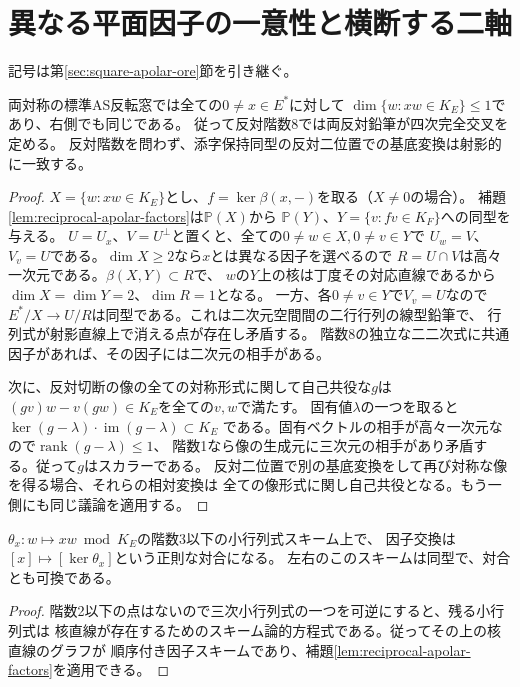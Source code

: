 \section{異なる平面因子の一意性と横断する二軸}
\label{sec:distinct-factor-rigidity}
記号は第\ref{sec:square-apolar-ore}節を引き継ぐ。

\begin{theorem}[各因子の相手の一意性]\label{thm:unique-linear-factor-partner}
両対称の標準AS反転窓では全ての$0\ne x\in E^*$に対して
$\dim\{w:xw\in K_E\}\le1$であり、右側でも同じである。
従って反対階数8では両反対鉛筆が四次完全交叉を定める。
反対階数を問わず、添字保持同型の反対二位置での基底変換は射影的に一致する。
\end{theorem}
\begin{proof}
$X=\{w:xw\in K_E\}$とし、$f=\ker\beta(x,-)$を取る（$X\ne0$の場合）。
補題\ref{lem:reciprocal-apolar-factors}は$\mathbb P(X)$から
$\mathbb P(Y)$、$Y=\{v:fv\in K_F\}$への同型を与える。
$U=U_x$、$V=U^\perp$と置くと、全ての$0\ne w\in X,0\ne v\in Y$で
$U_w=V$、$V_v=U$である。$\dim X\ge2$なら$x$とは異なる因子を選べるので
$R=U\cap V$は高々一次元である。$\beta(X,Y)\subset R$で、
$w$の$Y$上の核は丁度その対応直線であるから$\dim X=\dim Y=2$、$\dim R=1$となる。
一方、各$0\ne v\in Y$で$V_v=U$なので
$E^*/X\to U/R$は同型である。これは二次元空間間の二行行列の線型鉛筆で、
行列式が射影直線上で消える点が存在し矛盾する。
階数8の独立な二二次式に共通因子があれば、その因子には二次元の相手がある。

次に、反対切断の像の全ての対称形式に関して自己共役な$g$は
$(gv)w-v(gw)\in K_E$を全ての$v,w$で満たす。
固有値$\lambda$の一つを取ると$\ker(g-\lambda)\cdot\operatorname{im}(g-\lambda)\subset K_E$
である。固有ベクトルの相手が高々一次元なので$\operatorname{rank}(g-\lambda)\le1$、
階数1なら像の生成元に三次元の相手があり矛盾する。従って$g$はスカラーである。
反対二位置で別の基底変換をして再び対称な像を得る場合、それらの相対変換は
全ての像形式に関し自己共役となる。もう一側にも同じ議論を適用する。
\end{proof}

\begin{corollary}[スキームとしての因子曲面の切断]
$\theta_x:w\mapsto xw\bmod K_E$の階数3以下の小行列式スキーム上で、
因子交換は$[x]\mapsto[\ker\theta_x]$という正則な対合になる。
左右のこのスキームは同型で、対合とも可換である。
\end{corollary}
\begin{proof}
階数2以下の点はないので三次小行列式の一つを可逆にすると、残る小行列式は
核直線が存在するためのスキーム論的方程式である。従ってその上の核直線のグラフが
順序付き因子スキームであり、補題\ref{lem:reciprocal-apolar-factors}を適用できる。
\end{proof}

